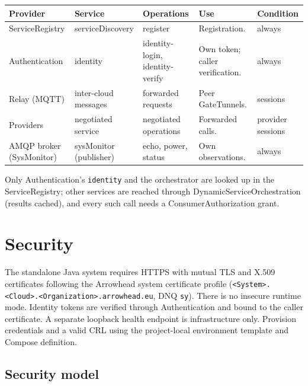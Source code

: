 \documentclass[a4paper]{arrowhead}
\begin{document}
\noindent\begin{longtable}{| >{\raggedright\arraybackslash}p{2.9cm} | >{\raggedright\arraybackslash}p{3.1cm} | >{\raggedright\arraybackslash}p{2.5cm} | p{3.6cm} | >{\raggedright\arraybackslash}p{2.9cm} |} \hline
\rowcolor{gray!33} Provider & Service & Operations & Use & Condition \\ \hline \endhead
ServiceRegistry & serviceDiscovery & register & Registration. & always \\ \hline
Authentication & identity & identity-login, identity-verify & Own token; caller verification. & always \\ \hline
Relay (MQTT) & inter-cloud messages & forwarded requests & Peer GateTunnels. & sessions \\ \hline
Providers & negotiated service & negotiated operations & Forwarded calls. & provider sessions \\ \hline
AMQP broker (SysMonitor) & sysMonitor (publisher) & echo, power, status & Own observations. & always \\ \hline
\end{longtable}

Only Authentication's \texttt{identity} and the orchestrator are looked up in the ServiceRegistry; other services are reached through DynamicServiceOrchestration (results cached), and every such call needs a ConsumerAuthorization grant.

\newpage

\section{Security}
\label{sec:security}

The standalone Java system requires HTTPS with mutual TLS and X.509 certificates following the Arrowhead system certificate profile (\texttt{<System>.<Cloud>.<Organization>.arrowhead.eu}, DNQ \texttt{sy}). There is no insecure runtime mode. Identity tokens are verified through Authentication and bound to the caller certificate. A separate loopback health endpoint is infrastructure only. Provision credentials and a valid CRL using the project-local environment template and Compose definition.

\subsection{Security model}
\end{document}
